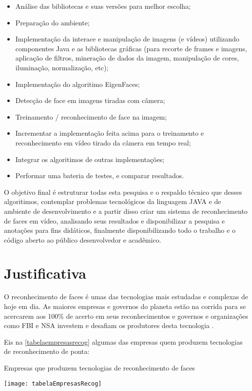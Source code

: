 \begin{itemize}
	\item Análise das bibliotecas e suas versões para melhor escolha;
	\item Preparação do ambiente;
	\item Implementação da interace e manipulação de imagens (e vídeos)  utilizando componentes Java e as bibliotecas gráficas (para  recorte de frames e imagens, aplicação de filtros, mineração de dados da imagem, manipulação de cores, iluminação, normalização, etc);
	\item Implementação do algoritimo EigenFaces;
	\item Detecção de face em imagens tiradas com câmera;
	\item Treinamento / reconhecimento de face na imagem;
	\item Incrementar a implementação feita acima para o treinamento  e reconhecimento em vídeo tirado da câmera em tempo real;
	\item Integrar os algoritimos de outras implementações;
	\item Performar uma bateria de testes, e comparar resultados.
\end{itemize}

O objetivo final é estruturar todas esta pesquisa e o respaldo técnico que desses algoritimos, contemplar problemas tecnológicos da linguagem JAVA e de ambiente de desenvolvimento e a partir disso criar um sistema de reconhecimento de faces em vídeo, analisando seus resultados e disponibilizar a pesquisa e anotações para fins didáticos, finalmente disponibilizando todo o trabalho e o código aberto ao público desenvolvedor e acadêmico.


\section{Justificativa} 

O reconhecimento de faces é umas das tecnologias mais estudadas e complexas de hoje em dia. As maiores empresas e governos do planeta estão na corrida para se acercarem aos 100\% de acerto em seus reconhecimentos e governos e organizações como FBI e NSA investem e desafiam os produtores desta tecnologia \cite{nstc_homeland}.

Eis na \autoref{tabelaempresasrecog} algumas das empresas quem produzem tecnologias de reconhecimento de ponta:

\vspace*{5cm}
\begin{table}[h]
	\centering
	\caption{Empresas que produzem tecnologias de reconhecimento de faces}
	\texttt{[image: tabelaEmpresasRecog]}
	\label{tabelaempresasrecog}
\end{table}



